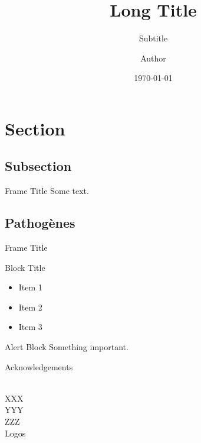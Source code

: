 \documentclass{myBeamer}
\title[Short Title]{Long Title}
\subtitle{Subtitle}
\author[Short Author]{Author}
\date{\today}
\institute{Institut}
\begin{document}
\begin{frame}[plain]
	\titlepage
\end{frame}
\addtocounter{framenumber}{-1}



\section{Section}
\subsection{Subsection}

\begin{frame}{Frame Title}
	Some text.
\end{frame}


\subsection{Pathogènes}

\begin{frame}{Frame Title}
	\begin{block}{Block Title}
	\begin{itemize}
		\item Item 1
		\item Item 2
		\item Item 3
	\end{itemize}
	\end{block}
	
	\begin{alertblock}{Alert Block}
		Something important.
	\end{alertblock}
\end{frame}


\backupbegin

\appendix
\begin{frame}[plain]{Acknowledgements}
	\begin{center}
	\\
	
	\medskip
	XXX\\
	\medskip
	YYY\\
	\medskip
	ZZZ\\
	
	\bigskip
	Logos
	\end{center}
	
\end{frame}

%

\backupend
\end{document}
